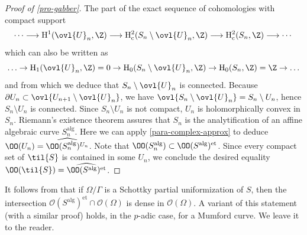 \begin{proof}[Proof of \ref{pro-gabber}]
 The part of the exact sequence of cohomologies with compact support
 \begin{equation*}
 \cdots\longrightarrow\mathrm{H}^1(\ovl{U}_n,\Z)\longrightarrow
 \mathrm{H}^2_{\mathrm{c}}(S_n\setminus\ovl{U}_n,\Z)\longrightarrow
 \mathrm{H}^2_{\mathrm{c}}(S_n,\Z)\longrightarrow\cdots
 \end{equation*}
 which can also be written as
 \begin{equation*}
 \ldots \rightarrow
 \mathrm{H}_1(\ovl{U}_n,\Z)=0\rightarrow
 \mathrm{H}_0(S_n\setminus \ovl{U}_n,\Z)\rightarrow
 \mathrm{H}_0(S_n,\Z)=\Z\rightarrow \ldots
 \end{equation*}
 and from which we deduce that $S_n\setminus \ovl{U}_n$ is
 connected.  Because $\partial U_n\subset \ovl{U_{n+1}\setminus
 \ovl{U}_n}$, we have $\ovl{S_n\setminus \ovl{U}_n}=S_n\setminus
 U_n$, hence $S_n\setminus U_n$ is connected.  Since $S_n\setminus U_n$
 is not compact, $U_n$ is holomorphically convex in $S_n$.
 Riemann's existence theorem assures that $S_n$ is the 
 analytification of an affine algebraic curve $S^{\mathrm{alg}}_n$.
 Here we can apply \ref{para-complex-approx} to deduce
 $\OO(U_n)=\widehat{\OO(S^{\mathrm{alg}}_n)^{U_n}}$.
 Note that 
 $\OO(S^{\mathrm{alg}}_n)\subset\OO(S^{\mathrm{alg}})^{\mathrm{et}}$.
 Since every compact set of $\til{S}$ is contained in some $U_n$, we 
 conclude the desired equality 
 $\OO(\til{S})=\widehat{\OO(S^{\mathrm{alg}})^{\mathrm{et}}}$.
\end{proof}

\begin{para}
 It follows from  that if $\Omega/\Gamma$ is 
 a Schottky partial uniformization of $S$, then
 the intersection $\mathcal{O}(S^{\mathrm{alg}})^{\mathrm{et}}\cap
 \mathcal{O}(\Omega)$ is dense in $\mathcal{O}(\Omega)$.  A variant of this
 statement (with a similar proof) holds, in the $p$-adic case, for a 
 Mumford curve.  We leave it to the reader.
\end{para}

